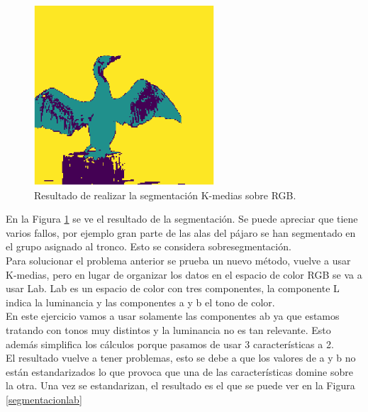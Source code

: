 \documentclass[a4paper,12pt]{report}
\begin{document}
\begin{figure}[h]
\centering
\includegraphics[width=0.6\textwidth]{imagenes/segmentacionrgb}
\caption{Resultado de realizar la segmentación K-medias sobre RGB.}
\label{segmentacionrgb}
\end{figure}

En la Figura \ref{segmentacionrgb} se ve el resultado de la segmentación. Se puede apreciar que tiene varios fallos, por ejemplo gran parte de las alas del pájaro se han segmentado en el grupo asignado al tronco. Esto se considera sobresegmentación.\\

Para solucionar el problema anterior se prueba un nuevo método, vuelve a usar K-medias, pero en lugar  de organizar los datos en el espacio de color RGB se va a usar Lab. Lab es un espacio de color con tres componentes, la componente L indica la luminancia y las componentes a y b el tono de color.\\

En este ejercicio vamos a usar solamente las componentes ab ya que estamos tratando con tonos muy distintos y la luminancia no es tan relevante. Esto además simplifica los cálculos porque pasamos de usar 3 características a 2.\\

El resultado vuelve a tener problemas, esto se debe a que los valores de a y b no están estandarizados lo que provoca que una de las características domine sobre la otra. Una vez se estandarizan, el resultado es el que se puede ver en la Figura \ref{segmentacionlab}\\
\end{document}

